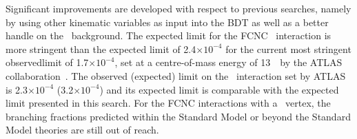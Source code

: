 Significant improvements are developed with respect to previous searches, namely by using other kinematic variables as input into the BDT as well as a better handle on the \NPL\ background.  The expected limit for the FCNC \Zut\ interaction is more stringent than the expected limit of 2.4$\times 10^{-4}$ for the current  most stringent observedlimit of 1.7$\times 10^{-4}$, set at a centre-of-mass energy of 13~\TeV\ by the ATLAS collaboration~\cite{ATLAS-CONF-2017-070}.  The  observed (expected) limit on the \Zct\ interaction set by ATLAS is 2.3$\times 10^{-4}$ (3.2$\times 10^{-4}$) and its expected limit is comparable with the expected limit presented  in this search.  For the FCNC interactions with a \tZq\ vertex, the branching fractions predicted within the Standard Model or beyond the Standard Model theories are still out of reach. 



